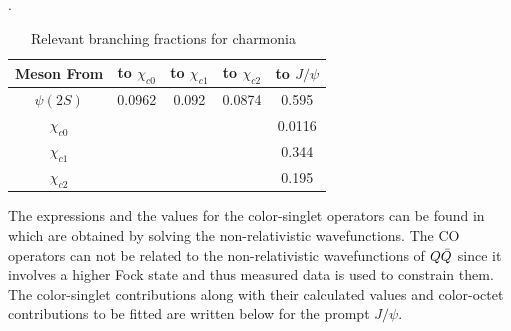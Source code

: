 \documentclass[aps,prc,preprint,superscriptaddress,showpacs,showkeys,amsmath]{revtex4-1}
\begin{document}
\begin{table}[h]
\caption{Relevant branching fractions for charmonia~\cite{Nakamura:2010zzi}}.
\begin{tabular}{c|cccc}
Meson From &to $\chi_{c0}$ &to $\chi_{c1}$ &to $\chi_{c2}$ &to $J/\psi$\\ 
\hline
$\psi(2S)$ & 0.0962 & 0.092 & 0.0874 & 0.595   \\
$\chi_{c0}$& &  &  & 0.0116           \\
$\chi_{c1}$& &  &  & 0.344           \\
$\chi_{c2}$& &  &  & 0.195           \\
\hline
\end{tabular}
\label{table:CharmoniaBFs}
\end{table}

  The expressions and the values for the color-singlet operators can be found 
in~\cite{Cho:1995ce,Cho:1995vh,Eichten:1994gt} which are obtained by solving the 
non-relativistic wavefunctions.
 The CO operators can not be related to the non-relativistic
wavefunctions of $Q{\bar{Q}}$ since it involves a higher Fock state and thus
measured data is used to constrain them.
  The color-singlet contributions along with their calculated values 
and color-octet contributions to be fitted are written below for the prompt
$J/\psi$.
\end{document}
